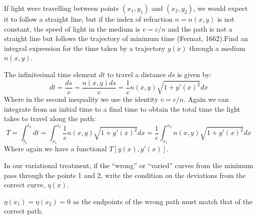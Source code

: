 \begin{p}
If light were travelling between points $(x_1,y_1)$ and $(x_2,y_2)$, we would expect it to follow a straight line, but if the index of refraction $n = n(x,y)$ is not constant, the speed of light in the medium is $v = c/n$ and the path is not a straight line but follows the trajectory of minimum time (Fermat, 1662).Find an integral expression for the time taken by a trajectory $y(x)$ through a medium $n(x,y)$.
\end{p}
\begin{s}
The infinitesimal time element $dt$ to travel a distance $ds$ is given by:
\[dt = \frac{ds}{v} = \frac{n(x,y) ds}{c} = \frac{1}{c} n(x,y)\sqrt{1 + y'(x)^2}dx \]
Where in the second inequality we use the identity $v = c/n$. Again we can integrate from an initial time to a final time to obtain the total time the light takes to travel along the path:
\[T = \int_{t_1}^{t_2} dt = \int_{x_1}^{x_2} \frac{1}{c} n(x,y)\sqrt{1 + y'(x)^2}dx = \frac{1}{c}\int_{x_1}^{x_2} n(x,y) \sqrt{1+y'(x)^2}dx\]
Where again we have a functional $T[y(x), y'(x)]$.
\end{s}

\begin{p}
In our variational treatment, if the “wrong” or “varied” curves from the minimum pass through the points 1 and 2, write the condition on the deviations from the correct curve, $\eta(x)$.
\end{p}
\begin{s}
$\eta(x_1) = \eta(x_2) = 0$ as the endpoints of the wrong path must match that of the correct path. 
\end{s}

